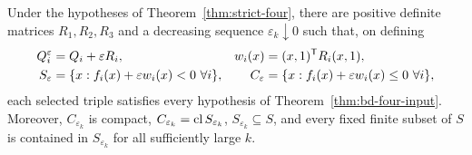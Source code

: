 \begin{lemma}\label{lem:inward-pdlc}
Under the hypotheses of Theorem~\ref{thm:strict-four}, there are
positive definite matrices $R_1,R_2,R_3$ and a decreasing sequence
$\varepsilon_k\downarrow0$ such that, on defining
\begin{align*}
 Q_i^\varepsilon&=Q_i+\varepsilon R_i,
 &w_i(x)&=(x,1)^{\mathsf T} R_i(x,1),\\
 S_\varepsilon&=\{x:f_i(x)+\varepsilon w_i(x)<0\ \forall i\},
 &C_\varepsilon&=\{x:f_i(x)+\varepsilon w_i(x)\leq0\ \forall i\},
\end{align*}
each selected triple satisfies every hypothesis of
Theorem~\ref{thm:bd-four-input}. Moreover, $C_{\varepsilon_k}$ is
compact, $C_{\varepsilon_k}=\operatorname{cl} S_{\varepsilon_k}$,
$S_{\varepsilon_k}\subseteq S$, and every fixed finite subset of $S$
is contained in $S_{\varepsilon_k}$ for all sufficiently large $k$.
\end{lemma}
